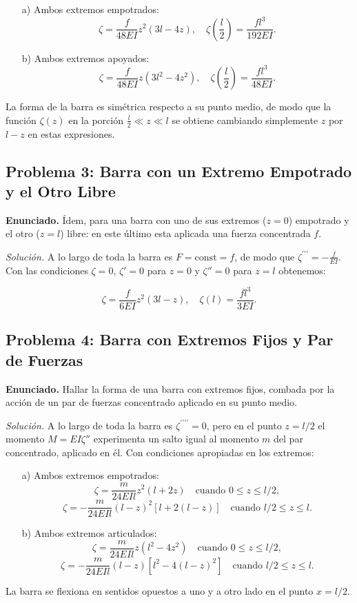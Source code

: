 \documentclass{article}
\begin{document}
\begin{enumerate}
    \item[a)] Ambos extremos empotrados:
    $$
    \zeta = \frac{f}{48EI} z^2(3l - 4z), \quad \zeta\left(\frac{l}{2}\right) = \frac{fl^3}{192EI}.
    $$

    \item[b)] Ambos extremos apoyados:
    $$
    \zeta = \frac{f}{48EI} z(3l^2 - 4z^2), \quad \zeta\left(\frac{l}{2}\right) = \frac{fl^3}{48EI}.
    $$
\end{enumerate}

La forma de la barra es simétrica respecto a su punto medio, de modo que la función $\zeta (z)$ en la porción $\frac{l}{2}\ll z\ll l$ se obtiene cambiando simplemente $z$ por $l-z$ en estas expresiones.

\subsection*{Problema 3: Barra con un Extremo Empotrado y el Otro Libre}
\textbf{Enunciado.} Ídem, para una barra con uno de sus extremos ($z=0$) empotrado y el otro ($z=l$) libre: en este último esta aplicada una fuerza concentrada $f$.

\textit{Solución.} A lo largo de toda la barra es $F = \text{const} = f$, de modo que $\zeta^{\prime\prime\prime} = -\frac{f}{EI}$. Con las condiciones $\zeta = 0$, $\zeta' = 0$ para $z = 0$ y $\zeta'' = 0$ para $z = l$ obtenemos:

$$
\zeta = \frac{f}{6EI} z^2(3l - z), \quad \zeta(l) = \frac{fl^3}{3EI}.
$$

\subsection*{Problema 4: Barra con Extremos Fijos y Par de Fuerzas}
\textbf{Enunciado.} Hallar la forma de una barra con extremos fijos, combada por la acción de un par de fuerzas concentrado aplicado en su punto medio.

\textit{Solución.} A lo largo de toda la barra es $\zeta^{\prime\prime\prime\prime} = 0$, pero en el punto $z = l/2$ el momento $M = EI\zeta''$ experimenta un salto igual al momento $m$ del par concentrado, aplicado en él. Con condiciones apropiadas en los extremos:

\begin{enumerate}
    \item[a)] Ambos extremos empotrados:
    $$
    \zeta = \frac{m}{24EIl} z^2(l + 2z) \quad \text{cuando } 0 \leq z \leq l/2,
    $$
    $$
    \zeta = -\frac{m}{24EIl} (l - z)^2[l + 2(l - z)] \quad \text{cuando } l/2 \leq z \leq l.
    $$

    \item[b)] Ambos extremos articulados:
    $$
    \zeta = \frac{m}{24EIl} z(l^2 - 4z^2) \quad \text{cuando } 0 \leq z \leq l/2,
    $$
    $$
    \zeta = -\frac{m}{24EIl} (l - z)[l^2 - 4(l - z)^2] \quad \text{cuando } l/2 \leq z \leq l.
    $$
\end{enumerate}
La barra se flexiona en sentidos opuestos a uno y a otro lado en el punto $x=l/2$.
\end{document}
